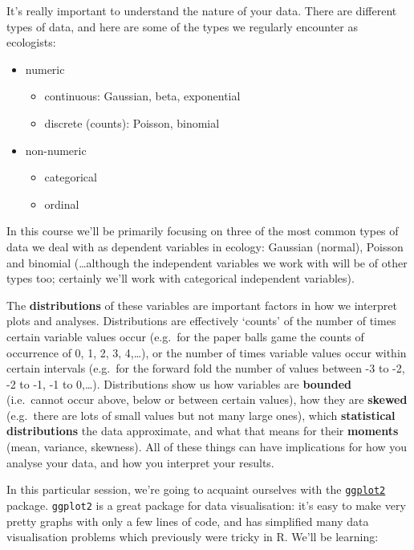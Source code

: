 \documentclass[
]{book}
\providecommand{\tightlist}{%
  \setlength{\itemsep}{0pt}\setlength{\parskip}{0pt}}
\begin{document}
It's really important to understand the nature of your data. There are different
types of data, and here are some of the types we regularly encounter as ecologists:

\begin{itemize}
\tightlist
\item
  numeric

  \begin{itemize}
  \tightlist
  \item
    continuous: Gaussian, beta, exponential
  \item
    discrete (counts): Poisson, binomial
  \end{itemize}
\item
  non-numeric

  \begin{itemize}
  \tightlist
  \item
    categorical
  \item
    ordinal\\
  \end{itemize}
\end{itemize}

In this course we'll be primarily focusing on three of the most common types
of data we deal with as dependent variables in ecology: Gaussian (normal),
Poisson and binomial (\ldots although the independent variables we work with
will be of other types too; certainly we'll work with categorical independent variables).

The \textbf{distributions} of these variables are important factors in how we
interpret plots and analyses. Distributions are effectively `counts' of the
number of times certain variable values occur (e.g.~for the paper balls game
the counts of occurrence of 0, 1, 2, 3, 4,\ldots), or the number of times variable
values occur within certain intervals (e.g.~for the forward fold the number of
values between -3 to -2, -2 to -1, -1 to 0,\ldots). Distributions show us how variables are
\textbf{bounded} (i.e.~cannot occur above, below or between certain values),
how they are \textbf{skewed} (e.g.~there are lots of small values but not many large ones),
which \textbf{statistical distributions} the data approximate, and what that means
for their \textbf{moments} (mean, variance, skewness). All of these things can have implications
for how you analyse your data, and how you interpret your results.

In this particular session, we're going to acquaint ourselves with the
\href{https://ggplot2.tidyverse.org/}{\texttt{ggplot2}} package. \texttt{ggplot2} is a great
package for data visualisation: it's easy to make very pretty graphs with
only a few lines of code, and has simplified many data visualisation problems
which previously were tricky in R. We'll be learning:
\end{document}
